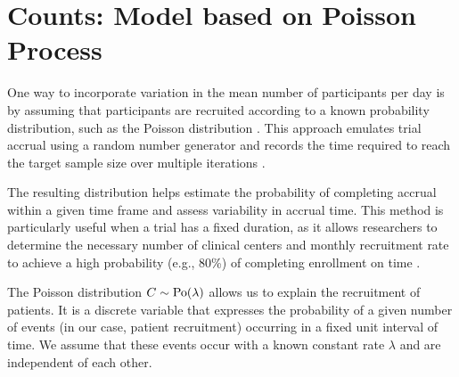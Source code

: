 \begin{table}[h!]
\centering
{}
\caption{Moments and aleatory and epistemic uncertainty in accrual until $t$ covered by different models for counts.}
\label{tab:count_modeling_2}
\end{table}


\section{Counts: Model based on Poisson Process}

One way to incorporate variation in the mean number of participants per day is by assuming that participants are recruited according to a known probability distribution, such as the Poisson distribution \citep{carter2004application}. This approach emulates trial accrual using a random number generator and records the time required to reach the target sample size over multiple iterations \citep{carter2005practical}. 

The resulting distribution helps estimate the probability of completing accrual within a given time frame and assess variability in accrual time. This method is particularly useful when a trial has a fixed duration, as it allows researchers to determine the necessary number of clinical centers and monthly recruitment rate to achieve a high probability (e.g., 80\%) of completing enrollment on time \citep{carter2005practical}.

The Poisson distribution $C\sim \rm{Po} (\lambda)$ allows us to explain the recruitment of patients. It is a discrete variable that expresses the probability of a given number of events (in our case, patient recruitment) occurring in a fixed unit interval of time. We assume that these events occur with a known constant rate $\lambda$ and are independent of each other.

